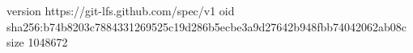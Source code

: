 version https://git-lfs.github.com/spec/v1
oid sha256:b74b8203c7884331269525c19d286b5ecbe3a9d27642b948fbb74042062ab08c
size 1048672
